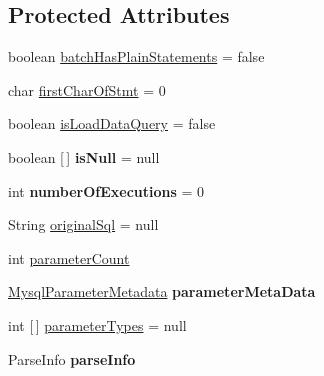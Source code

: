 \subsection*{Protected Attributes}
\begin{DoxyCompactItemize}
\item 
boolean \mbox{\hyperlink{classcom_1_1mysql_1_1jdbc_1_1_prepared_statement_ab2b6492262755a13533495771a983d2e}{batch\+Has\+Plain\+Statements}} = false
\item 
char \mbox{\hyperlink{classcom_1_1mysql_1_1jdbc_1_1_prepared_statement_ab4a2f47d871558da1216653add5dcbb3}{first\+Char\+Of\+Stmt}} = 0
\item 
boolean \mbox{\hyperlink{classcom_1_1mysql_1_1jdbc_1_1_prepared_statement_a3b5d2d6f48345edc1fc813d040ff041a}{is\+Load\+Data\+Query}} = false
\item 
\mbox{\label{classcom_1_1mysql_1_1jdbc_1_1_prepared_statement_a3374561b56d375f6ddfabf165322bb87}} 
boolean \mbox{[}$\,$\mbox{]} {\bfseries is\+Null} = null
\item 
\mbox{\label{classcom_1_1mysql_1_1jdbc_1_1_prepared_statement_a84c0187262c2bef05409990fd6a613af}} 
int {\bfseries number\+Of\+Executions} = 0
\item 
String \mbox{\hyperlink{classcom_1_1mysql_1_1jdbc_1_1_prepared_statement_a9378b4b930d85c095050653868c37d77}{original\+Sql}} = null
\item 
int \mbox{\hyperlink{classcom_1_1mysql_1_1jdbc_1_1_prepared_statement_aa558a4c2359849497f6e7b985fa4fb08}{parameter\+Count}}
\item 
\mbox{\label{classcom_1_1mysql_1_1jdbc_1_1_prepared_statement_a5686a7b6b020e4c6485b403ee5151ec3}} 
\mbox{\hyperlink{classcom_1_1mysql_1_1jdbc_1_1_mysql_parameter_metadata}{Mysql\+Parameter\+Metadata}} {\bfseries parameter\+Meta\+Data}
\item 
int \mbox{[}$\,$\mbox{]} \mbox{\hyperlink{classcom_1_1mysql_1_1jdbc_1_1_prepared_statement_a2ee36bea2958e84148585745d9aceffe}{parameter\+Types}} = null
\item 
\mbox{\label{classcom_1_1mysql_1_1jdbc_1_1_prepared_statement_ad68e5b636bc25c2cfe14755977564d83}} 
Parse\+Info {\bfseries parse\+Info}

\end{DoxyCompactItemize}
